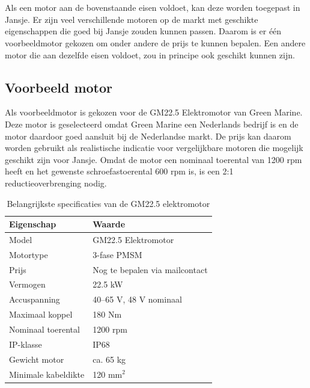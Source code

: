 \noindent

\section{}
Als een motor aan de bovenstaande eisen voldoet, kan deze worden toegepast in Jansje. Er zijn veel verschillende motoren op de markt met geschikte eigenschappen die goed bij Jansje zouden kunnen passen. Daarom is er één voorbeeldmotor gekozen om onder andere de prijs te kunnen bepalen. Een andere motor die aan dezelfde eisen voldoet, zou in principe ook geschikt kunnen zijn.


\subsection{Voorbeeld motor}
Als voorbeeldmotor is gekozen voor de GM22.5 Elektromotor van Green Marine. Deze motor is geselecteerd omdat Green Marine een Nederlands bedrijf is en de motor daardoor goed aansluit bij de Nederlandse markt. De prijs kan daarom worden gebruikt als realistische indicatie voor vergelijkbare motoren die mogelijk geschikt zijn voor Jansje. Omdat de motor een nominaal toerental van 1200 rpm heeft en het gewenste schroefastoerental 600 rpm is, is een 2:1 reductieoverbrenging nodig.

\begin{table}[h]
    \centering
    \caption{Belangrijkste specificaties van de GM22.5 elektromotor}
    \label{tab:gm22-5-motor}
    \begin{tabular}{ll}
        \hline
        \textbf{Eigenschap} & \textbf{Waarde\cite{greenmarine_gm225_datasheet}} \\
        \hline
        Model & GM22.5 Elektromotor \\
        Motortype & 3-fase PMSM \\
        Prijs & Nog te bepalen via mailcontact \\
        Vermogen & 22.5 kW \\
        Accuspanning & 40--65 V, 48 V nominaal \\
        Maximaal koppel & 180 Nm \\
        Nominaal toerental & 1200 rpm \\
        IP-klasse & IP68 \\
        Gewicht motor & ca. 65 kg \\
        Minimale kabeldikte & 120 mm$^2$ \\
        \hline
    \end{tabular}
\end{table}
